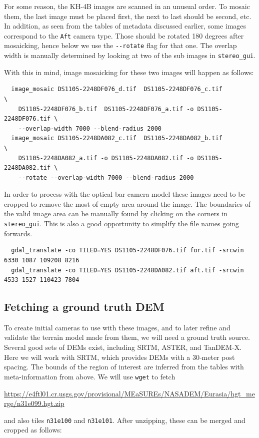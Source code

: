 For some reason, the KH-4B images are scanned in an unusual order. To
mosaic them, the last image must be placed first, the next to last
should be second, etc. In addition, as seen from the tables of metadata discussed
earlier, some images correspond to the \texttt{Aft} camera type. Those
should be rotated 180 degrees after mosaicking, hence below we use
the \texttt{-\/-rotate} flag for that one.  The overlap width is manually 
determined by looking at two of the sub images in \texttt{stereo\_gui}.

With this in mind, image mosaicking for these two images will happen as follows:

\begin{verbatim}
  image_mosaic DS1105-2248DF076_d.tif  DS1105-2248DF076_c.tif              \
    DS1105-2248DF076_b.tif  DS1105-2248DF076_a.tif -o DS1105-2248DF076.tif \
    --overlap-width 7000 --blend-radius 2000
  image_mosaic DS1105-2248DA082_c.tif  DS1105-2248DA082_b.tif              \
    DS1105-2248DA082_a.tif -o DS1105-2248DA082.tif -o DS1105-2248DA082.tif \
    --rotate --overlap-width 7000 --blend-radius 2000
\end{verbatim}

In order to process with the optical bar camera model these images need to be cropped
to remove the most of empty area around the image.  The boundaries of the valid image 
area can be manually found by clicking on the corners in \texttt{stereo\_gui}.
This is also a good opportunity to simplify the file names going forwards.

\begin{verbatim}
  gdal_translate -co TILED=YES DS1105-2248DF076.tif for.tif -srcwin 6330 1087 109208 8216
  gdal_translate -co TILED=YES DS1105-2248DA082.tif aft.tif -srcwin 4533 1527 110423 7804
\end{verbatim}

\subsection{Fetching a ground truth DEM}

To create initial cameras to use with these images, and to later refine and validate
the terrain model made from them, we will need a ground truth source. 
Several good sets of DEMs exist, including SRTM, ASTER, and TanDEM-X. Here we will
work with SRTM, which provides DEMs with a 30-meter post spacing. The bounds of the region 
of interest are inferred from the tables with meta-information from above. 
We will use \texttt{wget} to fetch
\begin{center}
\url{https://e4ftl01.cr.usgs.gov/provisional/MEaSUREs/NASADEM/Eurasia/hgt_merge/n31e099.hgt.zip}
\end{center}
and also tiles \texttt{n31e100} and \texttt{n31e101}. After unzipping, these can be
merged and cropped as follows:

